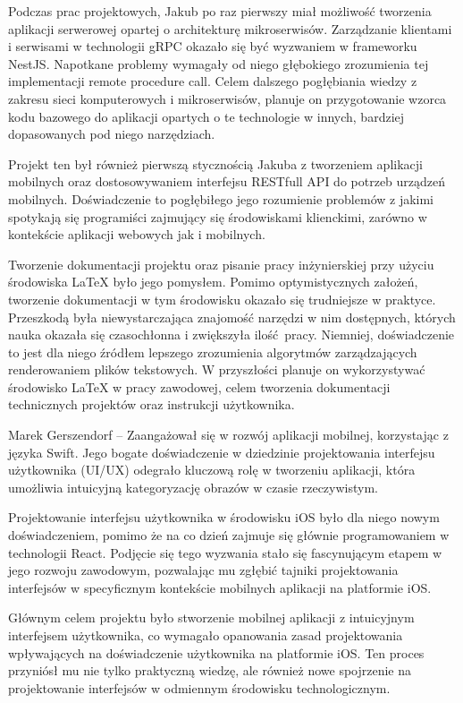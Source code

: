 \documentclass[12pt, a4paper, twoside, openany]{book}
\begin{document}
{Podczas prac projektowych, Jakub po raz pierwszy miał możliwość tworzenia aplikacji serwerowej opartej o architekturę mikroserwisów.
Zarządzanie klientami i serwisami w technologii gRPC okazało się być wyzwaniem w frameworku NestJS.
Napotkane problemy wymagały od niego głębokiego zrozumienia tej implementacji remote procedure call.
Celem dalszego pogłębiania wiedzy z zakresu sieci komputerowych i mikroserwisów, planuje on przygotowanie wzorca kodu bazowego do aplikacji opartych o te technologie w innych, bardziej dopasowanych pod niego narzędziach.

Projekt ten był również pierwszą stycznością Jakuba z tworzeniem aplikacji mobilnych oraz dostosowywaniem interfejsu RESTfull API do potrzeb urządzeń mobilnych.
Doświadczenie to pogłębiłego jego rozumienie problemów z jakimi spotykają się programiści zajmujący się środowiskami klienckimi, zarówno w kontekście aplikacji webowych jak i mobilnych.

Tworzenie dokumentacji projektu oraz pisanie pracy inżynierskiej przy użyciu środowiska LaTeX było jego pomysłem. Pomimo optymistycznych założeń, tworzenie dokumentacji w tym środowisku okazało się trudniejsze w praktyce. Przeszkodą była niewystarczająca znajomość narzędzi w nim dostępnych, których nauka okazała się czasochłonna i zwiększyła ilość pracy.
Niemniej, doświadczenie to jest dla niego źródłem lepszego zrozumienia algorytmów zarządzających renderowaniem plików tekstowych.
W przyszłości planuje on wykorzystywać środowisko LaTeX w pracy zawodowej, celem tworzenia dokumentacji technicznych projektów oraz instrukcji użytkownika.

Marek Gerszendorf -- Zaangażował się w rozwój aplikacji mobilnej, korzystając z języka Swift. Jego bogate doświadczenie w dziedzinie projektowania interfejsu użytkownika (UI/UX) odegrało kluczową rolę w tworzeniu aplikacji, która umożliwia intuicyjną kategoryzację obrazów w czasie rzeczywistym.

Projektowanie interfejsu użytkownika w środowisku iOS było dla niego nowym doświadczeniem, pomimo że na co dzień zajmuje się głównie programowaniem w technologii React. Podjęcie się tego wyzwania stało się fascynującym etapem w jego rozwoju zawodowym, pozwalając mu zgłębić tajniki projektowania interfejsów w specyficznym kontekście mobilnych aplikacji na platformie iOS.

Głównym celem projektu było stworzenie mobilnej aplikacji z intuicyjnym interfejsem użytkownika, co wymagało opanowania zasad projektowania wpływających na doświadczenie użytkownika na platformie iOS. Ten proces przyniósł mu nie tylko praktyczną wiedzę, ale również nowe spojrzenie na projektowanie interfejsów w odmiennym środowisku technologicznym.

}
\end{document}
